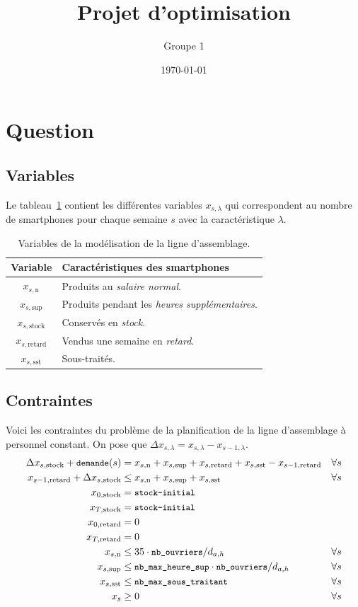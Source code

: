 \documentclass[12pt,oneside,a4paper]{article}
\title{Projet d'optimisation}
\author{Groupe 1}
\date{\today}
\newcommand{\question}
{
\addtocounter{section}{1}
\section*{Question \thesection}
}
\newcommand{\myX}[2]{x_{#1,\text{#2}}}
\newcommand{\xSemaine}[1]{\myX{s}{#1}}
\newcommand{\xn}{\xSemaine{n}}
\newcommand{\xsup}{\xSemaine{sup}}
\newcommand{\xstock}{\xSemaine{stock}}
\newcommand{\xretard}{\xSemaine{retard}}
\newcommand{\xsst}{\xSemaine{sst}}
\newcommand{\texttts}[1]{{\small\texttt{#1}}}
\begin{document}
\maketitle

\question %

\subsection*{Variables}
Le tableau~\ref{tab:variablesQuestion1} contient les différentes variables $x_{s,\lambda}$
qui correspondent au nombre de smartphones pour chaque semaine $s$
avec la caractéristique $\lambda$.

\begin{table}[h]
  \begin{center}
  \begin{tabular}{|c|l|}
    \hline
    Variable & Caractéristiques des smartphones \\
    \hline
    \hline
    $\xn$ & Produits au \emph{salaire normal}. \\
    \hline
    $\xsup$ & Produits pendant les \emph{heures supplémentaires}. \\
    \hline
    $\xstock$ & Conservés en \emph{stock}. \\
    \hline
    $\xretard$ & Vendus une semaine en \emph{retard}. \\
    \hline
    $\xsst$ & Sous-traités. \\
    \hline
  \end{tabular}
  \caption{Variables de la modélisation de la ligne d'assemblage.}
  \label{tab:variablesQuestion1}
  \end{center}
\end{table}

\subsection*{Contraintes}
Voici les contraintes du problème de la planification 
de la ligne d’assemblage à personnel constant.
On pose que $\Delta x_{s,\lambda} = x_{s,\lambda} - x_{s-1,\lambda}$.
\begin{align*}
  \Delta\xstock + \texttts{demande}(s) &= \xn + \xsup 
  + \xretard + \xsst - \myX{s-1}{retard} &\forall s \\
  \myX{s-1}{retard} + \Delta\xstock &\leq \xn + \xsup + \xsst &\forall s \\
  \myX{0}{stock} &= \texttts{stock-initial} \\
  \myX{T}{stock} &= \texttts{stock-initial} \\
  \myX{0}{retard}&= 0 \\
  \myX{T}{retard}&= 0 \\
  \xn &\leq 35\cdot \texttts{nb\_ouvriers}/ d_{a,h}
  &\forall s \\
  \xsup &\leq \texttts{nb\_max\_heure\_sup}\cdot\texttts{nb\_ouvriers}/ d_{a,h}
  &\forall s \\
  \xsst &\leq \texttts{nb\_max\_sous\_traitant} &\forall s \\
  x_s &\geq 0 &\forall s
\end{align*}
\end{document}
